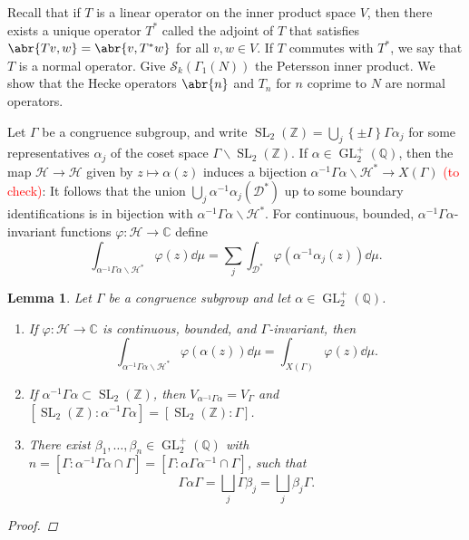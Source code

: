 \documentclass[10pt,leqno,twoside]{article}
\theoremstyle{plain}
\newtheorem{lemma}[lem]{Lemma}
\theoremstyle{definition}
\numberwithin{equation}{section}
\numberwithin{lem}{section}
\newcommand{\cbr}[1]{\left\{#1\right\}}
\newcommand{\textib}[1]{\textbf{\textit{#1\index{#1}}}} %
\DeclareMathOperator{\GL}{GL}
\DeclareMathOperator{\SL}{SL}
\newcommand{\slz}{\SL_2(\mathbb{Z})}
\newcommand{\glqp}{\GL_2^+(\mathbb{Q})}
\newcommand{\tbd}{{\Huge\color{red}{\textib{TO DO}}}}
\newcommand{\sai}[1]{\textcolor{red}{#1}}
\begin{document}
Recall that if $T$ is a linear operator on the inner product space $V$, then there exists a unique operator $T^\ast$ called the adjoint of $T$ that satisfies $\abr{Tv,w} = \abr{v,T^\ast w}$ for all $v,w\in V$. If $T$ commutes with $T^\ast$, we say that $T$ is a normal operator. Give $\mathcal S_k(\varGamma_1(N))$ the Petersson inner product. We show that the Hecke operators $\abr{n}$ and $T_n$ for $n$ coprime to $N$ are normal operators.

Let $\varGamma$ be a congruence subgroup, and write $\slz = \bigcup_j\cbr{\pm I}\varGamma \alpha_j$ for some representatives $\alpha_j$ of the coset space $\varGamma\backslash \slz$. If $\alpha\in\glqp$, then the map $\mathcal H\to\mathcal H$ given by $z \mapsto \alpha(z)$ induces a bijection $\alpha^{-1}\varGamma\alpha\backslash \mathcal H^\ast\to X(\varGamma)$ \tbd\sai{(to check)}: It follows that the union $\bigcup_j \alpha^{-1}\alpha_j(\mathcal D^\ast)$ up to some boundary identifications is in bijection with $\alpha^{-1}\varGamma\alpha\backslash \mathcal H^\ast$. For continuous, bounded, $\alpha^{-1}\varGamma\alpha$-invariant functions $\varphi\colon \mathcal H\to \mathbb C$ define
\[\int_{\alpha^{-1}\varGamma\alpha\backslash \mathcal H^\ast}\varphi(z)\dd\mu = \sum_j \int_{\mathcal D^\ast}\varphi(\alpha^{-1}\alpha_j(z))\dd\mu.\]

\begin{lemma}
    Let $\varGamma$ be a congruence subgroup and let $\alpha\in\glqp$.\begin{enumerate}[label = \textup{(\alph*)}]
        \item If $\varphi\colon\mathcal H\to\mathbb C$ is continuous, bounded, and $\varGamma$-invariant, then \[\int_{\alpha^{-1}\varGamma\alpha\backslash \mathcal H^\ast}\varphi(\alpha(z))\dd\mu = \int_{X(\varGamma)}\varphi(z)\dd\mu.\]
        \item If $\alpha^{-1}\varGamma\alpha\subset \slz$, then $V_{\alpha^{-1}\varGamma\alpha} = V_\varGamma$ and $[\slz : \alpha^{-1}\varGamma\alpha] = [\slz : \varGamma]$.
        \item There exist $\beta_1,\dots,\beta_n\in \glqp$ with $n=[\varGamma : \alpha^{-1}\varGamma\alpha\cap\varGamma] = [\varGamma : \alpha\varGamma\alpha^{-1}\cap \varGamma]$, such that \[\varGamma\alpha\varGamma = \bigsqcup_j\varGamma \beta_j = \bigsqcup_j\beta_j\varGamma.\]
    \end{enumerate}
    \begin{proof}
        \tbd
    \end{proof}
\end{lemma}
\end{document}
